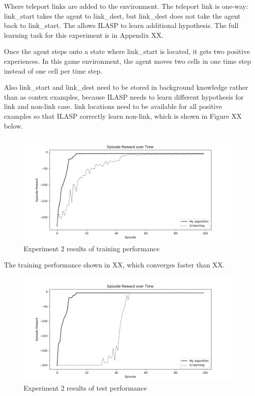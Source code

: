 Where teleport links are added to the environment. The teleport link is one-way: link\_start takes the agent to link\_dest, but link\_dest does not take the agent back to link\_start.
The allows ILASP to learn additional hypothesis.
The full learning task for this experiment is in Appendix XX.

Once the agent steps onto a state where link\_start is located, it gets two positive experiences.
In this game environment, the agent moves two cells in one time step instead of one cell per time step.

Also link\_start and link\_dest need to be stored in background knowledge rather than as contex examples,
because ILASP needs to learn different hypothesis for link and non-link case.
link locations need to be available for all positive examples so that ILASP correctly learn non-link, which is shown in Figure XX below.

\begin{figure}[!htb]
\centering
\includegraphics[width=1.0\textwidth]{./figures/experiment3_training}
\caption{Experiment 2 results of training performance}
\label{experiment3_training}
\end{figure}

The training performance shown in XX, which converges faster than XX.

\begin{figure}[!htb]
\centering
\includegraphics[width=1.0\textwidth]{./figures/experiment3_test}
\caption{Experiment 2 results of test performance}
\label{experiment3_test}
\end{figure}

